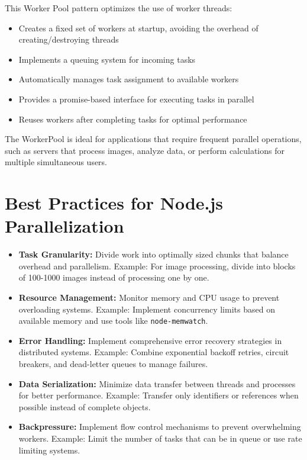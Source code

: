 This Worker Pool pattern optimizes the use of worker threads:
\begin{itemize}
    \item Creates a fixed set of workers at startup, avoiding the overhead of creating/destroying threads
    \item Implements a queuing system for incoming tasks
    \item Automatically manages task assignment to available workers
    \item Provides a promise-based interface for executing tasks in parallel
    \item Reuses workers after completing tasks for optimal performance
\end{itemize}

The WorkerPool is ideal for applications that require frequent parallel operations, such as servers that process images, analyze data, or perform calculations for multiple simultaneous users.

\section{Best Practices for Node.js Parallelization}

\begin{itemize}
    \item \textbf{\textcolor{accentColor}{Task Granularity:}} Divide work into optimally sized chunks that balance overhead and parallelism.
    Example: For image processing, divide into blocks of 100-1000 images instead of processing one by one.
    
    \item \textbf{\textcolor{accentColor}{Resource Management:}} Monitor memory and CPU usage to prevent overloading systems.
    Example: Implement concurrency limits based on available memory and use tools like \texttt{node-memwatch}.
    
    \item \textbf{\textcolor{accentColor}{Error Handling:}} Implement comprehensive error recovery strategies in distributed systems.
    Example: Combine exponential backoff retries, circuit breakers, and dead-letter queues to manage failures.
    
    \item \textbf{\textcolor{accentColor}{Data Serialization:}} Minimize data transfer between threads and processes for better performance.
    Example: Transfer only identifiers or references when possible instead of complete objects.
    
    \item \textbf{\textcolor{accentColor}{Backpressure:}} Implement flow control mechanisms to prevent overwhelming workers.
    Example: Limit the number of tasks that can be in queue or use rate limiting systems.
\end{itemize}

